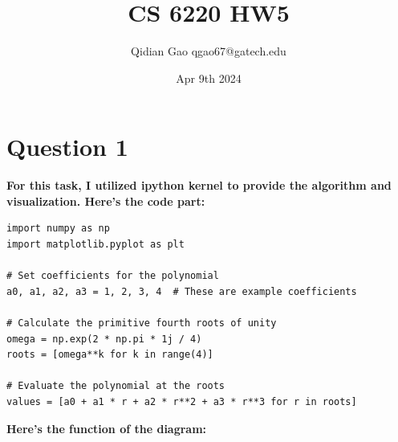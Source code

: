 \documentclass{article}
\title{CS 6220 HW5}
\author{Qidian Gao qgao67@gatech.edu}
\date{Apr 9th 2024}
\begin{document}
\maketitle
\section{Question 1}
\textbf{For this task, I utilized ipython kernel to provide the algorithm and visualization. Here's the code part:}
\begin{verbatim}
import numpy as np
import matplotlib.pyplot as plt

# Set coefficients for the polynomial
a0, a1, a2, a3 = 1, 2, 3, 4  # These are example coefficients

# Calculate the primitive fourth roots of unity
omega = np.exp(2 * np.pi * 1j / 4)
roots = [omega**k for k in range(4)]

# Evaluate the polynomial at the roots
values = [a0 + a1 * r + a2 * r**2 + a3 * r**3 for r in roots]
\end{verbatim}

\textbf{Here's the function of the diagram:}
\end{document}
